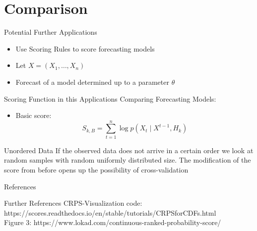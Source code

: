 \documentclass[aspectratio=43,10pt]{beamer}
\begin{document}
\section{Comparison}
\begin{frame}{Potential Further Applications}
    \begin{itemize}
        \item Use Scoring Rules to score forecasting models
        \item Let $X=(X_1,\dots,X_n)$ 
        \item Forecast of a model determined up to a parameter $\theta$
    \end{itemize}
\end{frame}
\begin{frame}{Scoring Function in this Applications}
Comparing Forecasting Models:
\begin{itemize}
    \item Basic score: \begin{equation*}
        S_{k,B}=\sum_{t=1}^n \log p(X_t\mid X^{t-1},H_k)
    \end{equation*}
\end{itemize}
    
\end{frame}
\begin{frame}{Unordered Data}
If the observed data does not arrive in a certain order we look at random samples with random uniformly distributed size. The modification of the score from before opens up the possibility of cross-validation
    
\end{frame}












\appendix
{}
\setcounter{finalframe}{\value{framenumber}}
\nocite{Gneiting}
\nocite{Unger}
\nocite{Candela}
\begin{frame}[noframenumbering]{References}


\end{frame}

\begin{frame}{Further References}
    CRPS-Visualization code: {https://scores.readthedocs.io/en/stable/tutorials/CRPS\textunderscore for\textunderscore CDFs.html}\\
    
    Figure 3: https://www.lokad.com/continuous-ranked-probability-score/
    
\end{frame}
\end{document}
